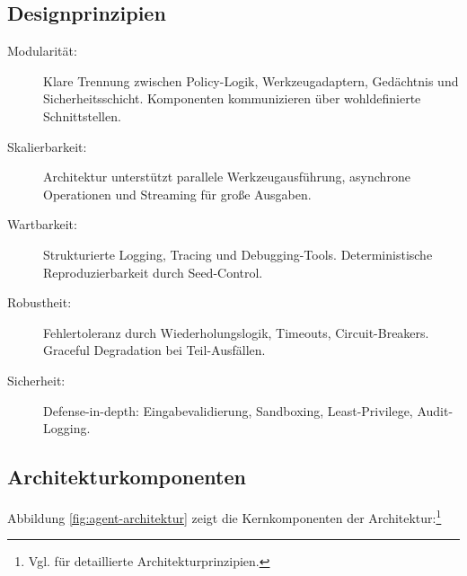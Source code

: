 \subsection{Designprinzipien}

\begin{sloppypar}
\begin{description}
  \item[Modularität:] Klare Trennung zwischen Policy-Logik, Werkzeugadaptern, Gedächtnis und Sicherheitsschicht. Komponenten kommunizieren über wohldefinierte Schnittstellen.
  
  \item[Skalierbarkeit:] Architektur unterstützt parallele Werkzeugausführung, asynchrone Operationen und Streaming für große Ausgaben.
  
  \item[Wartbarkeit:] Strukturierte Logging, Tracing und Debugging-Tools. Deterministische Reproduzierbarkeit durch Seed-Control.
  
  \item[Robustheit:] Fehlertoleranz durch Wiederholungslogik, Timeouts, Circuit-Breakers. Graceful Degradation bei Teil-Ausfällen.
  
  \item[Sicherheit:] Defense-in-depth: Eingabevalidierung, Sandboxing, Least-Privilege, Audit-Logging.
\end{description}
\end{sloppypar}

\subsection{Architekturkomponenten}

Abbildung \ref{fig:agent-architektur} zeigt die Kernkomponenten der Architektur:\footnote{Vgl. \cite{richards2020fundamentals} für detaillierte Architekturprinzipien.}

